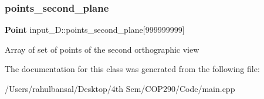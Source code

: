 \subsubsection{points\+\_\+second\+\_\+plane}
{\footnotesize\ttfamily \textbf{ Point} input\+\_\+D\+::points\+\_\+second\+\_\+plane[999999999]\hspace{0.3cm}{\ttfamily [private]}}

Array of set of points of the second orthographic view 

The documentation for this class was generated from the following file\+:\begin{DoxyCompactItemize}
\item 
/\+Users/rahulbansal/\+Desktop/4th Sem/\+C\+O\+P290/\+Code/main.\+cpp\end{DoxyCompactItemize}

